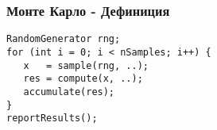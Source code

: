 
\begin{frame}[fragile]
\frametitle{Монте Карло - Дефиниция}
\pause
\begin{lstlisting}
RandomGenerator rng;
for (int i = 0; i < nSamples; i++) {
   x   = sample(rng, ..);
   res = compute(x, ..);
   accumulate(res);
}
reportResults();
\end{lstlisting}
\end{frame}
